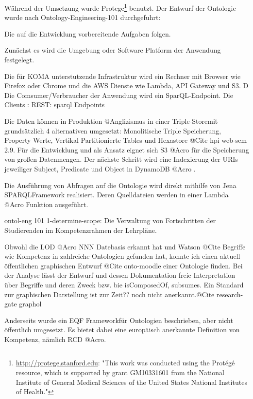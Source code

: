\documentclass[
12pt,
english,
ngerman,
headsepline,
twoside,
openright,
numbers=noenddot,version=first
]{scrreprt}
\begin{document}
Während der Umsetzung wurde Protege\footnote{\url{http://protege.stanford.edu}: "This work was conducted using the Protégé resource, which is supported by grant GM10331601 from the National Institute of General Medical Sciences of the United States National Institutes of Health."} benutzt.
Der Entwurf der Ontologie wurde nach Ontology-Engineering-101 durchgefuhrt:

Die auf die Entwicklung vorbereitende Aufgaben folgen.

Zunächst es wird die Umgebung oder Software Platform der Anwendung festgelegt.

Die für KOMA unterstutzende Infrastruktur wird ein Rechner mit Browser wie Firefox oder Chrome und die AWS Dienste wie Lambda, API Gateway und S3. D
Die Comsumer/Verbraucher der Anwendung wird ein SparQL-Endpoint\cite{SparqlLearn}.
Die Clients : REST: sparql Endpoints

Die Daten können in Produktion @Anglizismus in einer \glqq Triple-Store\grqq mit grundsätzlich 4 alternativen umgesetzt: Monolitische Triple Speicherung, Property Werte, Vertikal Partitionierte Tables und Hexastore @Cite hpi web-sem 2.9.
Für die Entwicklung und als Ansatz eignet sich S3 @Acro für die Speicherung von großen Datenmengen. Der nächste Schritt wird eine Indexierung der URIs jeweiliger Subject, Predicate und Object in DynamoDB @Acro .

Die Ausführung von Abfragen auf die Ontologie wird direkt mithilfe von \glqq Jena SPARQL\grqq Framework realisiert. Deren Quelldateien werden in einer Lambda @Acro Funktion ausgeführt.

ontol-eng 101
1-determine-scope:
Die Verwaltung von Fortschritten der Studierenden im Kompetenzrahmen der Lehrpläne.

Obwohl die LOD @Acro NNN Datebasis erkannt hat und Watson @Cite Begriffe wie Kompetenz in zahlreiche Ontologien gefunden hat, konnte ich einen aktuell öffentlichen graphischen Entwurf\cite{OntoMoodle} @Cite onto-moodle einer Ontologie finden.
Bei der Analyse lässt der Entwurf und dessen Dokumentation freie Interpretation über Begriffe und deren Zweck bzw. bie \glqq isComposedOf\grqq, \glqq subsumes\grqq. Ein Standard zur graphischen Darstellung ist zur Zeit?? noch nicht anerkannt.@Cite research-gate graphol

Anderseits wurde ein \glqq EQF Framework\grqq für Ontologien beschrieben, aber nicht öffentlich umgesetzt. Es bietet dabei eine europäisch anerkannte Definition von Kompetenz, nämlich RCD @Acro.
\end{document}
